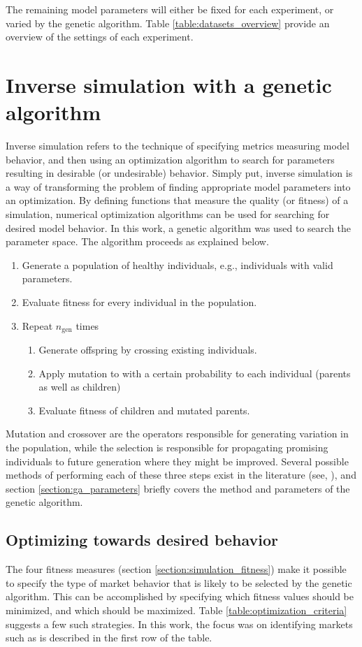 The remaining model parameters will either be fixed for each experiment, or varied by the genetic algorithm. Table \ref{table:datasets_overview} provide an overview of the settings of each experiment.

\section{Inverse simulation with a genetic algorithm}\label{section:genetic_algorithm}
Inverse simulation refers to the technique of specifying metrics measuring model behavior, and then using an optimization algorithm to search for parameters resulting in desirable (or undesirable) behavior. Simply put, inverse simulation is a way of transforming the problem of finding appropriate model parameters into an optimization. By defining functions that measure the quality (or fitness) of a simulation, numerical optimization algorithms can be used for searching for desired model behavior. In this work, a genetic algorithm was used to search the parameter space. The algorithm proceeds as explained below.
\begin{enumerate}
	\item Generate a population of healthy individuals, e.g., individuals with valid parameters.
	\item Evaluate fitness for every individual in the population.
	\item Repeat $n_\text{gen}$ times 
	\begin{enumerate}
		\item Generate offspring by crossing existing individuals.
		\item Apply mutation to with a certain probability to each individual (parents as well as children)
		\item Evaluate fitness of children and mutated parents.
	\end{enumerate}
\end{enumerate}
Mutation and crossover are the operators responsible for generating variation in the population, while the selection is responsible for propagating promising individuals to future generation where they might be improved. Several possible methods of performing each of these three steps exist in the literature (see\cite{whitley1994genetic}, \cite{davis1991handbook}), and section \ref{section:ga_parameters} briefly covers the method and parameters of the genetic algorithm.

\subsection{Optimizing towards desired behavior}
The four fitness measures (section \ref{section:simulation_fitness}) make it possible to specify the type of market behavior that is likely to be selected by the genetic algorithm. This can be accomplished by specifying which fitness values should be minimized, and which should be maximized. Table \ref{table:optimization_criteria} suggests a few such strategies. In this work, the focus was on identifying markets such as is described in the first row of the table.

